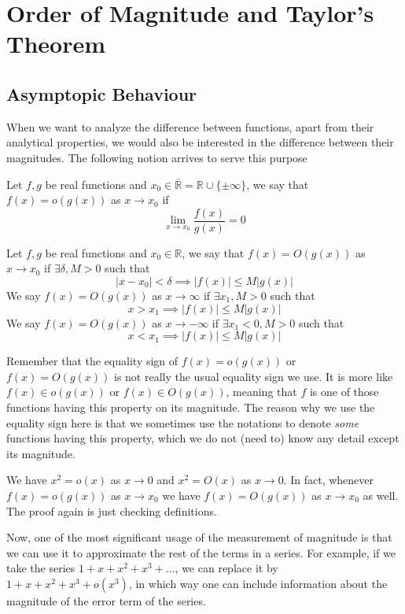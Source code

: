 \section{Order of Magnitude and Taylor's Theorem}
\subsection{Asymptopic Behaviour}
When we want to analyze the difference between functions, apart from their analytical properties, we would also be interested in the difference between their magnitudes.
The following notion arrives to serve this purpose
\begin{definition}
    Let $f, g$ be real functions and $x_0\in\bar{\mathbb R}=\mathbb R\cup\{\pm\infty\}$, we say that $f(x)=o(g(x))$ as $x\to x_0$ if
    $$\lim_{x\to x_0}\frac{f(x)}{g(x)}=0$$
\end{definition}
\begin{definition}
    Let $f, g$ be real functions and $x_0\in\mathbb R$, we say that $f(x)=O(g(x))$ as $x\to x_0$ if $\exists\delta,M>0$ such that
    $$|x-x_0|<\delta\implies |f(x)|\le M|g(x)|$$
    We say $f(x)=O(g(x))$ as $x\to\infty$ if $\exists x_1,M>0$ such that
    $$x>x_1\implies |f(x)|\le M|g(x)|$$
    We say $f(x)=O(g(x))$ as $x\to-\infty$ if $\exists x_1<0,M>0$ such that
    $$x<x_1\implies |f(x)|\le M|g(x)|$$
\end{definition}
\begin{remark}
    Remember that the equality sign of $f(x)=o(g(x))$ or $f(x)=O(g(x))$ is not really the usual equality sign we use.
    It is more like $f(x)\in o(g(x))$ or $f(x)\in O(g(x))$, meaning that $f$ is one of those functions having this property on its magnitude.
    The reason why we use the equality sign here is that we sometimes use the notations to denote \textit{some} functions having this property, which we do not (need to) know any detail except its magnitude.
\end{remark}
\begin{example}
    We have $x^2=o(x)$ as $x\to0$ and $x^2=O(x)$ as $x\to0$. In fact, whenever $f(x)=o(g(x))$ as $x\to x_0$ we have $f(x)=O(g(x))$ as $x\to x_0$ as well. The proof again is just checking definitions.
\end{example}
Now, one of the most significant usage of the measurement of magnitude is that we can use it to approximate the rest of the terms in a series.
For example, if we take the series $1+x+x^2+x^3+\ldots$, we can replace it by $1+x+x^2+x^3+o(x^3)$, in which way one can include information about the magnitude of the error term of the series.
